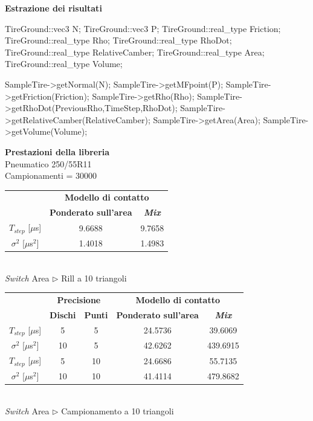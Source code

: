 \documentclass[xcolor=dvipsnames]{beamer} %
\begin{document}
\begin{frame}[fragile]
	\Large{\textbf{Estrazione dei risultati}}
	\normalsize
\begin{pseudoc}
TireGround::vec3 N;
TireGround::vec3 P;
TireGround::real_type Friction;
TireGround::real_type Rho;
TireGround::real_type RhoDot;
TireGround::real_type RelativeCamber;
TireGround::real_type Area;
TireGround::real_type Volume;

SampleTire->getNormal(N);
SampleTire->getMFpoint(P);
SampleTire->getFriction(Friction);
SampleTire->getRho(Rho);
SampleTire->getRhoDot(PreviousRho,TimeStep,RhoDot);
SampleTire->getRelativeCamber(RelativeCamber);
SampleTire->getArea(Area);
SampleTire->getVolume(Volume);
\end{pseudoc}
\end{frame}

\begin{frame}
	\Large {\textbf{Prestazioni della libreria}}\\
	\normalsize
	Pneumatico 250/55R11\\
	Campionamenti = 30000
	\begin{table}
		\centering
		\begin{tabular}{c|c|c|}
			\cline{2-3} 
			& \multicolumn{2}{c|}{\textbf{Modello di contatto}} \\
			\cline{2-3} 
			& \textbf{Ponderato sull'area} & \textbf{\textit{Mix}} \\ 
			\hline
			\multicolumn{1}{|c|}{$T_{step}$ [$\mu$s]} & 9.6688 & 9.7658 \\ 
			\hline 
			\multicolumn{1}{|c|}{$\sigma^2$ [$\mu$s$^2$]} & 1.4018 & 1.4983 \\ 
			\hline
		\end{tabular}
		\\[0.1cm]
		\textit{Switch} Area $\triangleright$ Rill a 10 triangoli
	\end{table}
	\begin{table}
		\centering
		\begin{tabular}{c|c|c|c|c|}
			\cline{2-5} 
			& \multicolumn{2}{c|}{\textbf{Precisione}} &\multicolumn{2}{c|}{\textbf{Modello di contatto}} \\
			\cline{2-5} 
			& \textbf{Dischi} & \textbf{Punti} & \textbf{Ponderato sull'area} & \textbf{\textit{Mix}} \\ 
			\hline
			\multicolumn{1}{|c|}{$T_{step}$ [$\mu$s]} & 5 & 5 & 24.5736 & 39.6069 \\ 
			\hline 
			\multicolumn{1}{|c|}{$\sigma^2$ [$\mu$s$^2$]} & 10 & 5 & 42.6262 & 439.6915 \\ 
			\hline
			
			\multicolumn{1}{|c|}{$T_{step}$ [$\mu$s]} & 5 & 10 & 24.6686 & 55.7135 \\ 
			\hline 
			\multicolumn{1}{|c|}{$\sigma^2$ [$\mu$s$^2$]} & 10 & 10 & 41.4114 & 479.8682 \\ 
			\hline
		\end{tabular}
		\\[0.1cm]
		\textit{Switch} Area $\triangleright$ Campionamento a 10 triangoli
	\end{table}
\end{frame}
\end{document}
